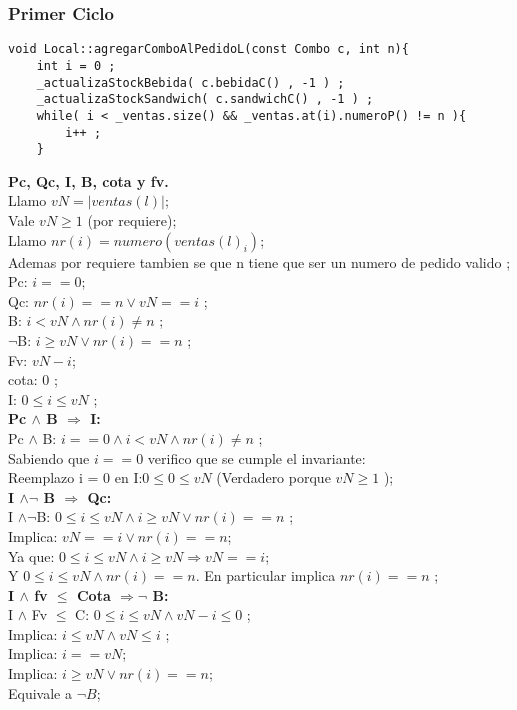 \subsubsection{Primer Ciclo}
\begin{lstlisting}
void Local::agregarComboAlPedidoL(const Combo c, int n){
	int i = 0 ;
	_actualizaStockBebida( c.bebidaC() , -1 ) ;
	_actualizaStockSandwich( c.sandwichC() , -1 ) ;
	while( i < _ventas.size() && _ventas.at(i).numeroP() != n ){
		i++ ;
	}
\end{lstlisting}

\hspace{15pt}\textbf{Pc, Qc, I, B, cota y fv.} \\
Llamo $vN = |ventas(l)| $;\\
Vale $vN \geq 1$ (por requiere); \\
Llamo $nr(i) = numero(ventas(l)_i) $; \\
Ademas por requiere tambien se que n tiene que ser un numero de pedido valido ;\\
Pc: $i == 0$; \\
Qc: $nr(i) == n \vee vN == i$ ; \\
B: $i < vN \wedge nr(i) \neq n$ ; \\
$\neg$B: $i \geq vN \vee nr(i) == n$ ; \\
Fv: $vN - i $; \\
cota: 0 ; \\
I: $0 \leq i \leq vN $ ; \\
	
\hspace{15pt}\textbf{Pc $\wedge$ B $\Rightarrow$ I:} \\
Pc $\wedge$ B: $i == 0 \wedge i < vN \wedge nr(i) \neq n$ ; \\
Sabiendo que $i == 0$ verifico que se cumple el invariante: \\
Reemplazo i = 0 en I:$ 0 \leq 0 \leq vN $ (Verdadero porque $vN \geq 1$ );  \\

\hspace{15pt}\textbf{I $\wedge \neg $ B $\Rightarrow$ Qc:} \\
I $\wedge \neg$B: $0 \leq i \leq vN \wedge i \geq vN \vee nr(i) == n$ ; \\
Implica: $vN == i \vee nr(i) == n  $; \\
Ya que: $0 \leq i \leq vN \wedge i \geq vN \Rightarrow vN == i $; \\
Y $0 \leq i \leq vN \wedge nr(i) == n$. En particular implica $nr(i) == n$ ; \\

\hspace{15pt}\textbf{I $\wedge$ fv $\leq$ Cota $\Rightarrow \neg$ B:} \\
I $\wedge$ Fv $\leq$ C: $0 \leq i \leq vN \wedge vN - i \leq 0$ ; \\
Implica: $ i \leq vN \wedge vN \leq i$ ; \\
Implica: $i == vN$; \\
Implica: $i \geq vN \vee nr(i) == n$; \\
Equivale a $\neg B$; \\

\newpage %

